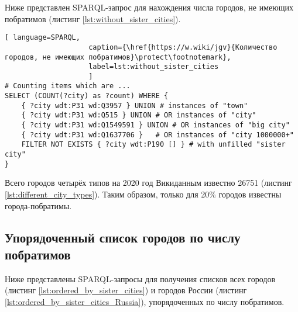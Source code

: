 Ниже представлен SPARQL-запрос для нахождения числа городов, не имеющих побратимов (листинг \ref{lst:without_sister_cities}).


\begin{lstlisting}[ language=SPARQL, 
                    caption={\href{https://w.wiki/jgv}{Количество городов, не имеющих побратимов}\protect\footnotemark},
                    label=lst:without_sister_cities
                    ]
# Counting items which are ... 
SELECT (COUNT(?city) as ?count) WHERE {                             
	{ ?city wdt:P31 wd:Q3957 } UNION # instances of "town"          
	{ ?city wdt:P31 wd:Q515 } UNION # OR instances of "city"                 
	{ ?city wdt:P31 wd:Q1549591 } UNION # OR instances of "big city"                       
	{ ?city wdt:P31 wd:Q1637706 } 	# OR instances of "city 1000000+"              
	FILTER NOT EXISTS { ?city wdt:P190 [] } # with unfilled "sister city"
}
\end{lstlisting}

Всего городов четырёх типов на 2020 год Викиданным известно \num{26751} (листинг \ref{lst:different_city_types}). Таким образом, только для 20\% городов известны города-побратимы.

\subsection{Упорядоченный список городов по числу побратимов}

Ниже представлены SPARQL-запросы для получения списков всех городов (листинг \ref{lst:ordered_by_sister_cities}) и городов России (листинг \ref{lst:ordered_by_sister_cities_Russia}), упорядоченных по числу побратимов.


